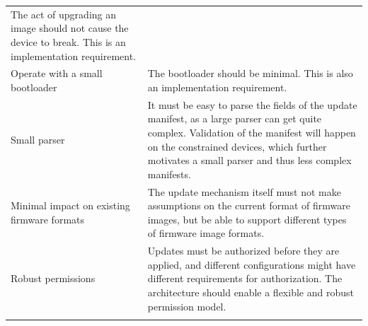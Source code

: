 \documentclass[0-thesis.tex]{subfiles}
\begin{document}
\begin{small}
\begin{longtable}[]{@{}ll@{}}
\begin{minipage}[t]{0.53\columnwidth}
        The act of upgrading an image should not cause the device to break. This
        is an implementation requirement.\strut
        \end{minipage}\tabularnewline
        \begin{minipage}[t]{0.41\columnwidth}\raggedright\strut
        Operate with a small bootloader\strut
        \end{minipage} & \begin{minipage}[t]{0.53\columnwidth}\raggedright\strut
        The bootloader should be minimal. This is also an implementation
        requirement.\strut
        \end{minipage}\tabularnewline
        \begin{minipage}[t]{0.41\columnwidth}\raggedright\strut
        Small parser\strut
        \end{minipage} & \begin{minipage}[t]{0.53\columnwidth}\raggedright\strut
        It must be easy to parse the fields of the update manifest, as a large
        parser can get quite complex. Validation of the manifest will happen on
        the constrained devices, which further motivates a small parser and thus
        less complex manifests.\strut
        \end{minipage}\tabularnewline
        \begin{minipage}[t]{0.41\columnwidth}\raggedright\strut
        Minimal impact on existing firmware formats\strut
        \end{minipage} & \begin{minipage}[t]{0.53\columnwidth}\raggedright\strut
        The update mechanism itself must not make assumptions on the current
        format of firmware images, but be able to support different types of
        firmware image formats.\strut
        \end{minipage}\tabularnewline
        \begin{minipage}[t]{0.41\columnwidth}\raggedright\strut
        Robust permissions\strut
        \end{minipage} & \begin{minipage}[t]{0.53\columnwidth}\raggedright\strut
        Updates must be authorized before they are applied, and different
        configurations might have different requirements for authorization. The
        architecture should enable a flexible and robust permission model.\strut
        \end{minipage}\tabularnewline
        \begin{minipage}[t]{0.41\columnwidth}\raggedright\strut

\end{minipage}
\end{longtable}
\end{small}
\end{document}
